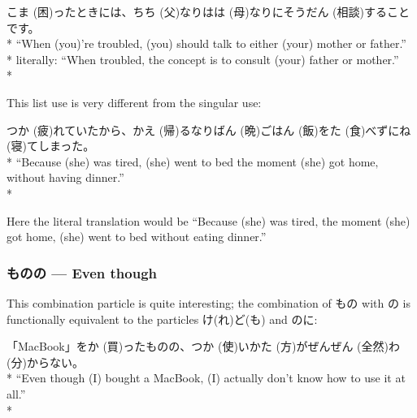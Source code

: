 \documentclass[11pt, b5paper, twoside, openright, onecolumn]{book}
\makeatletter
\newcommand*{\rubystack}[2]{{\relscale{0.5}%
  \begin{tabular}[b]{@{}c@{}}%
    {#1}\\%
   {\textscale{2}{#2}}%
  \end{tabular}}%
}
\DeclareRobustCommand*{\ruby}[2]{%
  \mbox{%
    \setlength{\parskip}{0ex}%
    \BeginAccSupp{method=pdfstringdef,ActualText={#1}}%
      \rubystack{\phantom{#2}}{#1}%
      \llap{%
        \rubystack{#2}{\phantom{#1}}%
      }%
    \EndAccSupp{}%
  }%
}
\renewcommand*{\ruby}[2]{#2 (#1)}%
\newenvironment{exampleblock}{
\setlength{\parindent}{0.6in}
\begin{minipage}[t]{\dimexpr\textwidth-\parindent}}
{\end{minipage}}
\makeatother
\begin{document}
\vspace{0.4cm}
\begin{exampleblock}
\ruby{困}{こま}ったときには、\ruby{父}{ちち}なり\ruby{母}{はは}なりに\ruby{相談}{そうだん}することです。 \\* 
“When (you)’re troubled‚ (you) should talk to either (your) mother or father.” \\* 
literally: “When troubled‚ the concept is to consult (your) father or mother.” \\* 
\end{exampleblock}
\vspace{0.2cm}

This list use is very different from the singular use:

\vspace{0.4cm}
\begin{exampleblock}
\ruby{疲}{つか}れていたから、\ruby{帰}{かえ}るなり\ruby{晩}{ばん}ご\ruby{飯}{はん}を\ruby{食}{た}べずに\ruby{寝}{ね}てしまった。 \\* 
“Because (she) was tired‚ (she) went to bed the moment (she) got home‚ without having dinner.” \\* 
\end{exampleblock}
\vspace{0.2cm}

Here the literal translation would be “Because (she) was tired‚ the moment (she) got home‚ (she) went to bed without eating dinner.”

\subsubsection{ものの — Even though}

This combination particle is quite interesting; the combination of もの with の is functionally equivalent to the particles け(れ)ど(も) and のに:

\vspace{0.4cm}
\begin{exampleblock}
「MacBook」を\ruby{買}{か}ったものの、\ruby{使}{つか}い\ruby{方}{かた}が\ruby{全然}{ぜんぜん}\ruby{分}{わ}からない。 \\* 
“Even though (I) bought a MacBook‚ (I) actually don’t know how to use it at all.” \\* 
\end{exampleblock}
\vspace{0.2cm}
\end{document}
